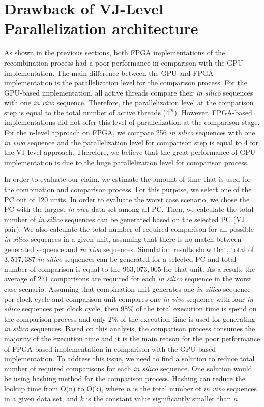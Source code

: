 \section{Drawback of VJ-Level Parallelization architecture}\label{sec:VJ-leveldrawback}
As shown in the previous sections, both FPGA implementations of the recombination process had a poor performance in comparison with the GPU implementation. The main difference between the GPU and FPGA implementation is the parallelization level for the comparison process. For the GPU-based implementation, all active threads compare their \emph{in silico} sequences with one \emph{in vivo} sequence. Therefore, the parallelization level at the comparison step is equal to the total number of active threads ($4^m$). However, FPGA-based implementations did not offer this level of parallelization at the comparison stage. For the n-level approach on FPGA, we compare 256 \emph{in silico} sequences with one \emph{in vivo} sequence and the parallelization level for comparison step is equal to 4 for the VJ-level approach. Therefore, we believe that the great performance of GPU implementation is due to the huge parallelization level for comparison process. 

In order to evaluate our claim, we estimate the amount of time that is used for the combination and comparison process. For this purpose, we select one of the PC out of 120 units. In order to evaluate the worst case scenario, we chose the PC with the largest \emph{in vivo} data set among all PC. Then, we calculate the total number of \emph{in silico} sequences can be generated based on the selected PC (VJ pair). We also calculate the total number of required comparison for all possible \emph{in silico} sequences in a given unit, assuming that there is no match between generated sequence and \emph{in vivo} sequences. Simulation results show that, total of $3,517,387$ \emph{in silico} sequences can be generated for a selected PC and total number of comparison is equal to the $963,073,005$ for that unit. As a result, the average of $271$ comparisons are required for each \emph{in silico} sequence in the worst case scenario. Assuming that combination unit generates one \emph{in silico} sequence per clock cycle and comparison unit compares one \emph{in vivo} sequence with four \emph{in silico} sequences per clock cycle, then 98\% of the total execution time is spend on the comparison process and only 2\% of the execution time is used for generating \emph{in silico} sequences. Based on this analysis, the comparison process consumes the majority of the execution time and it is the main reason for the poor performance of FPGA-based implementation in comparison with the GPU-based implementation. To address this issue, we need to find a solution to reduce total number of required comparisons for each \emph{in silico} sequence. One solution would be using hashing method for the comparison process. Hashing can reduce the lookup time from O(n) to O(k), where $n$ is the total number of \emph{in vivo} sequences in a given data set, and $k$ is the constant value significantly smaller than $n$. 

